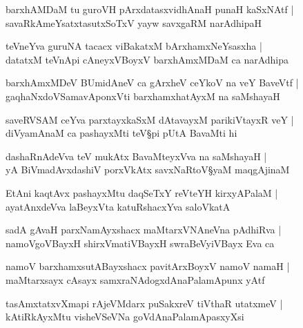 \begin{shloka}
barxhAMDaM tu guroVH pArxdatasxvidhAnaH punaH kaSxNAtf |\\
savaRkAmeYsatxtasutxSoTxV yayw savxgaRM narAdhipaH 
\end{shloka}

\begin{shloka}
teVneYva guruNA tacacx viBakatxM bArxhamxNeYsasxha |\\
datatxM teVnApi cAneyxVBoyxV barxhAmxMDaM ca narAdhipa 
\end{shloka}

\begin{shloka}
barxhAmxMDeV BUmidAneV ca gArxheV ceYkoV na veY BaveVtf |\\
gaqhaNx\R doVSamavAponxVti barxhamxhatAyxM na saMshayaH 
\end{shloka}

\begin{shloka}
saveRVSAM ceYva parxtayxkaSxM dAtavayxM parikiVtayxR veY |\\
diVyamAnaM ca pashayxMti teV\S pi pUtA BavaMti hi
\end{shloka}

\begin{shloka}
dashaRnAdeVva teV mukAtx BavaMteyxVva na saMshayaH |\\
yA BiVmadAvxdashiV porxVkAtx savxNaRtoV\S yaM maqgAjinaM 
\end{shloka}

\begin{shloka}
EtAni kaqtAvx pashayxMtu daqSeTxY reVteYH kirxyAPalaM |\\
ayatAnxdeVva laBeyxVta katuRshacxYva saloVkatA 
\end{shloka}

\begin{shloka}
sadA gAvaH parxNamAyxshacx maMtarxVNAneVna  pAdhiRva |\\
namoVgoVBayxH shirxVmatiVBayxH swraBeVyiVBayx Eva ca 
\end{shloka}

\begin{shloka}
namoV barxhamxsutABayxshacx pavitArxBoyxV namoV namaH |\\
maMtarxsayx cAsayx samxraNAdogxdAnaPalamApunx yAtf
\end{shloka}

\begin{shloka}
tasAmxtatxvXmapi rAjeVMdarx puSakxreV tiVthaR utatxmeV |\\
kAtiRkAyxMtu visheVSeVNa goVdAnaPalamApasxyXsi 
\end{shloka}

